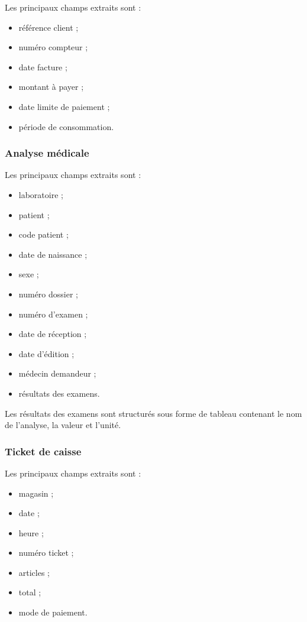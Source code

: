 Les principaux champs extraits sont :

\begin{itemize}
\item référence client ;
\item numéro compteur ;
\item date facture ;
\item montant à payer ;
\item date limite de paiement ;
\item période de consommation.
\end{itemize}

\subsubsection{Analyse médicale}

Les principaux champs extraits sont :

\begin{itemize}
\item laboratoire ;
\item patient ;
\item code patient ;
\item date de naissance ;
\item sexe ;
\item numéro dossier ;
\item numéro d'examen ;
\item date de réception ;
\item date d'édition ;
\item médecin demandeur ;
\item résultats des examens.
\end{itemize}

Les résultats des examens sont structurés sous forme de tableau contenant le nom de l'analyse, la valeur et l'unité.

\subsubsection{Ticket de caisse}

Les principaux champs extraits sont :

\begin{itemize}
\item magasin ;
\item date ;
\item heure ;
\item numéro ticket ;
\item articles ;
\item total ;
\item mode de paiement.
\end{itemize}

